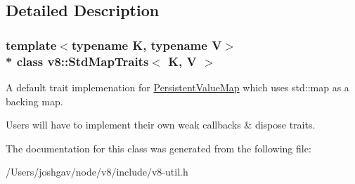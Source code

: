 \subsection{Detailed Description}
\subsubsection*{template$<$typename K, typename V$>$\\*
class v8\+::\+Std\+Map\+Traits$<$ K, V $>$}

A default trait implemenation for \hyperlink{classv8_1_1_persistent_value_map}{Persistent\+Value\+Map} which uses std\+::map as a backing map.

Users will have to implement their own weak callbacks \& dispose traits. 

The documentation for this class was generated from the following file\+:\begin{DoxyCompactItemize}
\item 
/\+Users/joshgav/node/v8/include/v8-\/util.\+h\end{DoxyCompactItemize}
